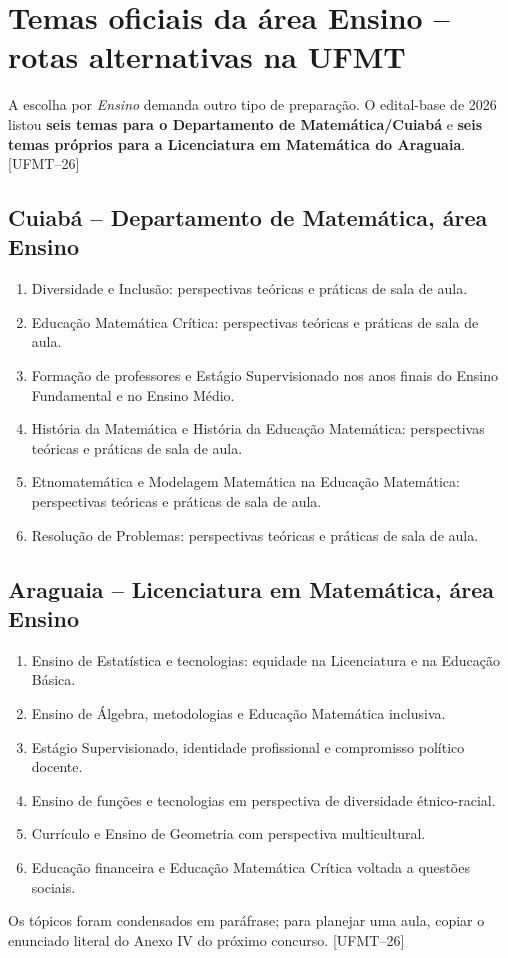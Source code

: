 \documentclass[11pt,a4paper]{article}
\newcommand{\fufmt}{\textsf{[UFMT--26]}}
\begin{document}
\section{Temas oficiais da área Ensino -- rotas alternativas na UFMT}
A escolha por \emph{Ensino} demanda outro tipo de preparação. O edital-base de 2026 listou \textbf{seis temas para o Departamento de Matemática/Cuiabá} e \textbf{seis temas próprios para a Licenciatura em Matemática do Araguaia}. \fufmt

\subsection{Cuiabá -- Departamento de Matemática, área Ensino}
\begin{enumerate}
\item Diversidade e Inclusão: perspectivas teóricas e práticas de sala de aula.
\item Educação Matemática Crítica: perspectivas teóricas e práticas de sala de aula.
\item Formação de professores e Estágio Supervisionado nos anos finais do Ensino Fundamental e no Ensino Médio.
\item História da Matemática e História da Educação Matemática: perspectivas teóricas e práticas de sala de aula.
\item Etnomatemática e Modelagem Matemática na Educação Matemática: perspectivas teóricas e práticas de sala de aula.
\item Resolução de Problemas: perspectivas teóricas e práticas de sala de aula.
\end{enumerate}

\subsection{Araguaia -- Licenciatura em Matemática, área Ensino}
\begin{enumerate}
\item Ensino de Estatística e tecnologias: equidade na Licenciatura e na Educação Básica.
\item Ensino de Álgebra, metodologias e Educação Matemática inclusiva.
\item Estágio Supervisionado, identidade profissional e compromisso político docente.
\item Ensino de funções e tecnologias em perspectiva de diversidade étnico-racial.
\item Currículo e Ensino de Geometria com perspectiva multicultural.
\item Educação financeira e Educação Matemática Crítica voltada a questões sociais.
\end{enumerate}
Os tópicos foram condensados em paráfrase; para planejar uma aula, copiar o enunciado literal do Anexo IV do próximo concurso. \fufmt
\end{document}
